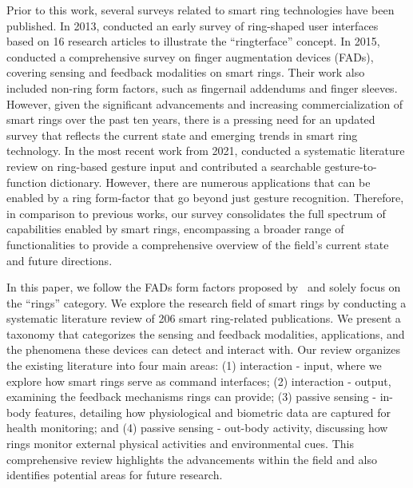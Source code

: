 Prior to this work, several surveys related to smart ring technologies have been published. 
In 2013, \citet{rissanen2013subtle} conducted an early survey of ring-shaped user interfaces based on 16 research articles to illustrate the ``ringterface'' concept. 
In 2015, \citet{shilkrot2015digital} conducted a comprehensive survey on finger augmentation devices (FADs), covering sensing and feedback modalities on smart rings. Their work also included non-ring form factors, such as fingernail addendums and finger sleeves. 
However, given the significant advancements and increasing commercialization of smart rings over the past ten years, there is a pressing need for an updated survey that reflects the current state and emerging trends in smart ring technology. 
In the most recent work from 2021, \citet{vatavu2021gesturing} conducted a systematic literature review on ring-based gesture input and contributed a searchable gesture-to-function dictionary. 
However, there are numerous applications that can be enabled by a ring form-factor that go beyond just gesture recognition.  
Therefore, in comparison to previous works, our survey consolidates the full spectrum of capabilities enabled by smart rings, encompassing a broader range of functionalities to provide a comprehensive overview of the field's current state and future directions.


In this paper, we follow the FADs form factors proposed by~\citet{shilkrot2015digital} and solely focus on the ``rings'' category. 
We explore the research field of smart rings by conducting a systematic literature review of 206 smart ring-related publications. 
We present a taxonomy that categorizes the sensing and feedback modalities, applications, and the phenomena these devices can detect and interact with. Our review organizes the existing literature into four main areas: (1) interaction - input, where we explore how smart rings serve as command interfaces; (2) interaction - output, examining the feedback mechanisms rings can provide; (3) passive sensing - in-body features, detailing how physiological and biometric data are captured for health monitoring; and (4) passive sensing - out-body activity, discussing how rings monitor external physical activities and environmental cues. This comprehensive review highlights the advancements within the field and also identifies potential areas for future research.